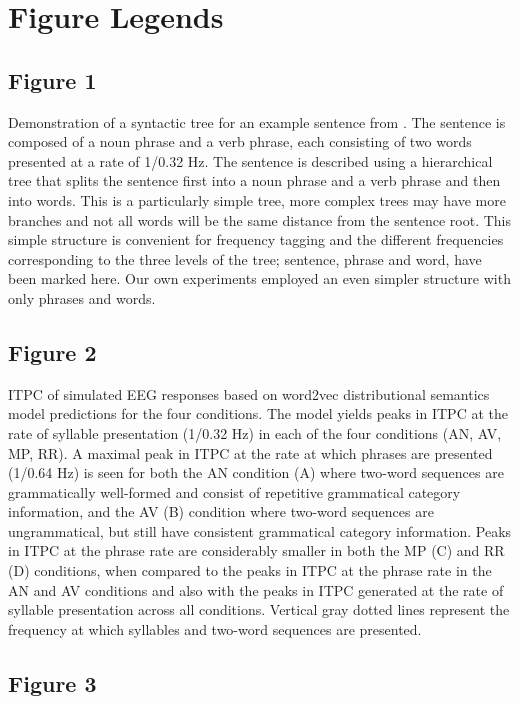 \documentclass[10pt,letterpaper]{article}
\begin{document}
\section*{Figure Legends}

\subsection*{Figure 1}

Demonstration of a syntactic tree for an example sentence from \cite{DingEtAl2016, DingEtAl2017}. The sentence is composed of a noun phrase and a verb phrase, each consisting of two words presented at a rate of 1/0.32 Hz.  The sentence is described using a hierarchical tree that splits the sentence first into a noun phrase and a verb phrase and then into words. This is a particularly simple tree, more complex trees may have more branches and not all words will be the same distance from the sentence root. This simple structure is convenient for frequency tagging and the different frequencies corresponding to the three levels of the tree; sentence, phrase and word, have been marked here. Our own experiments employed an even simpler structure with only phrases and words.

\subsection*{Figure 2}
ITPC of simulated EEG responses based on word2vec distributional semantics model predictions for the four conditions. The model yields peaks in ITPC at the rate of syllable presentation (1/0.32 Hz) in each of the four conditions (AN, AV, MP, RR). A maximal peak in ITPC at the rate at which phrases are presented (1/0.64 Hz) is seen for both the AN condition (A) where two-word sequences are grammatically well-formed and consist of repetitive grammatical category information, and the AV (B) condition where two-word sequences are ungrammatical, but still have consistent grammatical category information. Peaks in ITPC at the phrase rate are considerably smaller in both the MP (C) and RR (D) conditions, when compared to the peaks in ITPC at the phrase rate in the AN and AV conditions and also with the peaks in ITPC generated at the rate of syllable presentation across all conditions. Vertical gray dotted lines represent the frequency at which syllables and two-word sequences are presented.

\subsection*{Figure 3}
\end{document}
